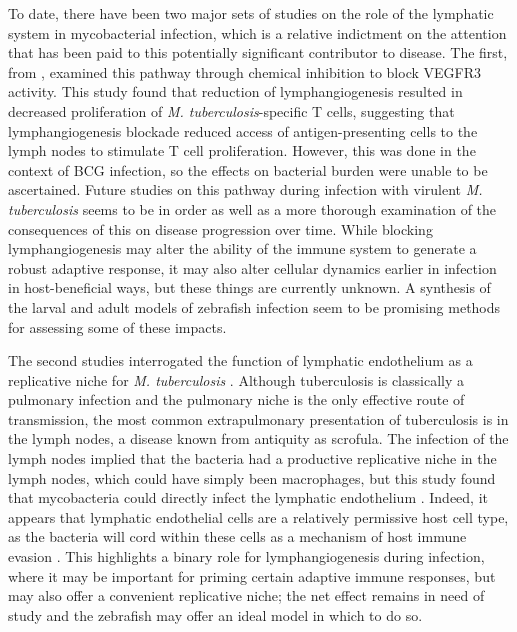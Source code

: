To date, there have been two major sets of studies on the role of the lymphatic system in mycobacterial infection, which is a relative indictment on the attention that has been paid to this potentially significant contributor to disease. The first, from \citet{Harding2015}, examined this pathway through chemical inhibition to block VEGFR3 activity. This study found that reduction of lymphangiogenesis resulted in decreased proliferation of \textit{M. tuberculosis}\hyp{}specific T cells, suggesting that lymphangiogenesis blockade reduced access of antigen\hyp{}presenting cells to the lymph nodes to stimulate T cell proliferation. However, this was done in the context of BCG infection, so the effects on bacterial burden were unable to be ascertained. Future studies on this pathway during infection with virulent \textit{M. tuberculosis} seems to be in order as well as a more thorough examination of the consequences of this on disease progression over time. While blocking lymphangiogenesis may alter the ability of the immune system to generate a robust adaptive response, it may also alter cellular dynamics earlier in infection in host\hyp{}beneficial ways, but these things are currently unknown. A synthesis of the larval and adult models of zebrafish infection seem to be promising methods for assessing some of these impacts.

The second studies interrogated the function of lymphatic endothelium as a replicative niche for \textit{M. tuberculosis} \citep{Lerner2016, Lerner2020}. Although tuberculosis is classically a pulmonary infection and the pulmonary niche is the only effective route of transmission, the most common extrapulmonary presentation of tuberculosis is in the lymph nodes, a disease known from antiquity as scrofula. The infection of the lymph nodes implied that the bacteria had a productive replicative niche in the lymph nodes, which could have simply been macrophages, but this study found that mycobacteria could directly infect the lymphatic endothelium \citep{Lerner2016}. Indeed, it appears that lymphatic endothelial cells are a relatively permissive host cell type, as the bacteria will cord within these cells as a mechanism of host immune evasion \citep{Lerner2020}. This highlights a binary role for lymphangiogenesis during infection, where it may be important for priming certain adaptive immune responses, but may also offer a convenient replicative niche; the net effect remains in need of study and the zebrafish may offer an ideal model in which to do so.

